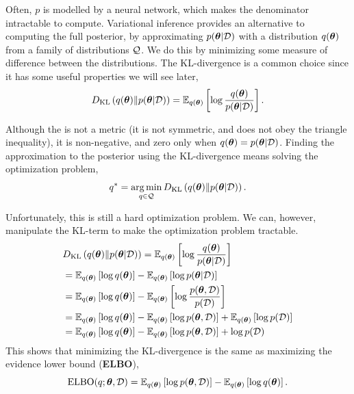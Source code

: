 \documentclass[twoside]{article}
\begin{document}
Often, \(p\) is modelled by a neural network, which makes the denominator
intractable to compute. Variational inference provides an alternative to
computing the full posterior, by approximating \(p(\boldsymbol \theta \vert \mathcal{D})\) with
a distribution \(q(\boldsymbol \theta)\) from a family of distributions \(\mathcal{Q}\). We
do this by minimizing some measure of difference between the distributions. The
KL-divergence is a common choice since it has some useful properties we will
see later,
\begin{equation*}
  D_{\mathrm{KL}}\left( q(\boldsymbol \theta) \middle\Vert p(\boldsymbol \theta \vert \mathcal{D}) \right) =
  \mathbb{E}_{q(\boldsymbol \theta)} \left[ \log \frac{q(\boldsymbol \theta)}{p(\boldsymbol \theta \vert \mathcal{D})} \right].
\end{equation*}

Although the is not a metric (it is not symmetric, and does not obey the
triangle inequality), it is non-negative, and zero only when
\(q(\boldsymbol \theta) = p(\boldsymbol \theta \vert \mathcal{D})\). Finding the approximation to the
posterior using the KL-divergence means solving the optimization problem,
\begin{equation*}
  q^* = \operatorname*{arg\,min}_{q \in \mathcal{Q}} D_{\mathrm{KL}}\left( q(\boldsymbol \theta) \middle\Vert p(\boldsymbol \theta \vert \mathcal{D}) \right).
\end{equation*}

Unfortunately, this is still a hard optimization problem. We can, however,
manipulate the KL-term to make the optimization problem tractable.
\begin{align*}
  &D_{\mathrm{KL}}\left( q(\boldsymbol \theta) \middle\Vert p(\boldsymbol \theta \vert \mathcal{D}) \right) =
  \mathbb{E}_{q(\boldsymbol \theta)} \left[ \log \frac{q(\boldsymbol \theta)}{p(\boldsymbol \theta \vert \mathcal{D})} \right]\\
  &= \mathbb{E}_{q(\boldsymbol \theta)} \left[ \log q(\boldsymbol \theta) \right] - \mathbb{E}_{q(\boldsymbol \theta)} \left[ \log p(\boldsymbol \theta \vert \mathcal{D}) \right]\\
  &= \mathbb{E}_{q(\boldsymbol \theta)} \left[ \log q(\boldsymbol \theta) \right] - \mathbb{E}_{q(\boldsymbol \theta)} \left[ \log
  \frac{p(\boldsymbol \theta, \mathcal{D})}{p(\mathcal{D})} \right]\\
  &= \mathbb{E}_{q(\boldsymbol \theta)} \left[ \log q(\boldsymbol \theta) \right] - \mathbb{E}_{q(\boldsymbol \theta)} \left[ \log p(\boldsymbol \theta, \mathcal{D}) \right] +
  \mathbb{E}_{q(\boldsymbol \theta)} \left[ \log p(\mathcal{D}) \right]\\
  &= \mathbb{E}_{q(\boldsymbol \theta)} \left[ \log q(\boldsymbol \theta) \right] - \mathbb{E}_{q(\boldsymbol \theta)} \left[ \log p(\boldsymbol \theta, \mathcal{D}) \right] +
  \log p(\mathcal{D})\\
\end{align*}
This shows that minimizing the KL-divergence is the same as maximizing the
evidence lower bound (\textbf{ELBO}),
\begin{equation*}
  \mathrm{ELBO}(q; \boldsymbol \theta, \mathcal{D}) = \mathbb{E}_{q(\boldsymbol \theta)} \left[ \log p(\boldsymbol \theta, \mathcal{D}) \right] -
  \mathbb{E}_{q(\boldsymbol \theta)} \left[ \log q(\boldsymbol \theta) \right].
\end{equation*}
\end{document}

